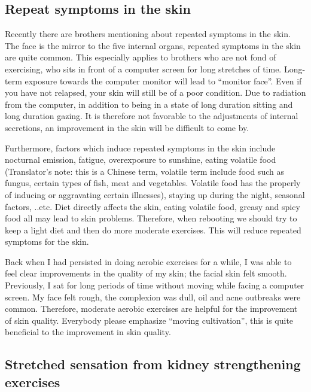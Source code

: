 \documentclass[
]{book}
\begin{document}
\hypertarget{repeat-symptoms-in-the-skin}{%
\subsection{Repeat symptoms in the skin}\label{repeat-symptoms-in-the-skin}}

Recently there are brothers mentioning about repeated symptoms in the skin. The face is the mirror to the five internal organs, repeated symptoms in the skin are quite common. This especially applies to brothers who are not fond of exercising, who sits in front of a computer screen for long stretches of time. Long-term exposure towards the computer monitor will lead to ``monitor face''. Even if you have not relapsed, your skin will still be of a poor condition. Due to radiation from the computer, in addition to being in a state of long duration sitting and long duration gazing. It is therefore not favorable to the adjustments of internal secretions, an improvement in the skin will be difficult to come by.

Furthermore, factors which induce repeated symptoms in the skin include nocturnal emission, fatigue, overexposure to sunshine, eating volatile food (Translator's note: this is a Chinese term, volatile term include food such as fungus, certain types of fish, meat and vegetables. Volatile food has the properly of inducing or aggravating certain illnesses), staying up during the night, seasonal factors, ..etc. Diet directly affects the skin, eating volatile food, greasy and spicy food all may lead to skin problems. Therefore, when rebooting we should try to keep a light diet and then do more moderate exercises. This will reduce repeated symptoms for the skin.

Back when I had persisted in doing aerobic exercises for a while, I was able to feel clear improvements in the quality of my skin; the facial skin felt smooth. Previously, I sat for long periods of time without moving while facing a computer screen. My face felt rough, the complexion was dull, oil and acne outbreaks were common. Therefore, moderate aerobic exercises are helpful for the improvement of skin quality. Everybody please emphasize ``moving cultivation'', this is quite beneficial to the improvement in skin quality.

\hypertarget{stretched-sensation-from-kidney-strengthening-exercises}{%
\subsection{Stretched sensation from kidney strengthening exercises}\label{stretched-sensation-from-kidney-strengthening-exercises}}
\end{document}
